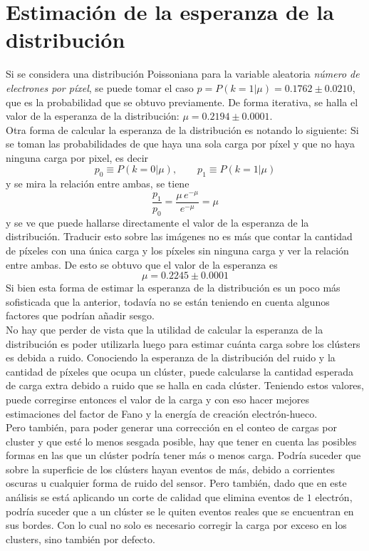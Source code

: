 \section{Estimación de la esperanza de la distribución}
\noindent Si se considera una distribución Poissoniana para la variable aleatoria \textit{número de electrones por píxel}, se puede tomar el caso $p = P(k = 1 | \mu) = 0.1762 \pm 0.0210$, que es la probabilidad que se obtuvo previamente. De forma iterativa, se halla el valor de la esperanza de la distribución: $\mu = 0.2194 \pm 0.0001$.\\
\indent Otra forma de calcular la esperanza de la distribución es notando lo siguiente: Si se toman las probabilidades de que haya una sola carga por píxel y que no haya ninguna carga por pixel, es decir
\begin{equation*}
    p_{0} \equiv P(k = 0 | \mu),
    \quad
    \quad
    p_{1} \equiv P(k = 1 | \mu)
\end{equation*}
y se mira la relación entre ambas, se tiene
\begin{equation*}
    \frac{p_{1}}{p_{0}} = \frac{\mu\,e^{-\mu}}{e^{-\mu}} = \mu
\end{equation*}
y se ve que puede hallarse directamente el valor de la esperanza de la distribución. Traducir esto sobre las imágenes no es más que contar la cantidad de píxeles con una única carga y los píxeles sin ninguna carga y ver la relación entre ambas. De esto se obtuvo que el valor de la esperanza es 
\begin{equation*}
    \mu = 0.2245 \pm 0.0001
\end{equation*}
Si bien esta forma de estimar la esperanza de la distribución es un poco más sofisticada que la anterior, todavía no se están teniendo en cuenta algunos factores que podrían añadir sesgo.\\
\indent No hay que perder de vista que la utilidad de calcular la esperanza de la distribución es poder utilizarla luego para estimar cuánta carga sobre los clústers es debida a ruido. Conociendo la esperanza de la distribución del ruido y la cantidad de píxeles que ocupa un clúster, puede calcularse la cantidad esperada de carga extra debido a ruido que se halla en cada clúster. Teniendo estos valores, puede corregirse entonces el valor de la carga y con eso hacer mejores estimaciones del factor de Fano y la energía de creación electrón-hueco.\\
\indent Pero también, para poder generar una corrección en el conteo de cargas por cluster y que esté lo menos sesgada posible, hay que tener en cuenta las posibles formas en las que un clúster podría tener más o menos carga. Podría suceder que sobre la superficie de los clústers hayan eventos de más, debido a corrientes oscuras u cualquier forma de ruido del sensor. Pero también, dado que en este análisis se está aplicando un corte de calidad que elimina eventos de $1$ electrón, podría suceder que a un clúster se le quiten eventos reales que se encuentran en sus bordes. Con lo cual no solo es necesario corregir la carga por exceso en los clusters, sino también por defecto.\\
